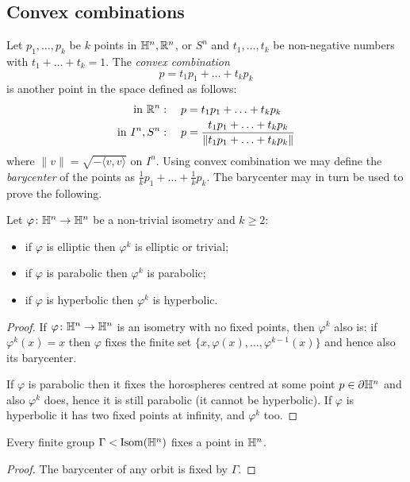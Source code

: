 \subsection{Convex combinations} \label{convex:subsection}
Let $p_1,\ldots, p_k$ be $k$ points in $\mathbb{H}^n, \mathbb{R}^n$, or $S^n$ and $t_1,\ldots, t_k$ be non-negative numbers with $t_1+\ldots + t_k=1$. The \emph{convex combination}   
$$p = t_1p_1+ \ldots + t_kp_k$$ 
is another point in the space defined as follows:
\begin{align*}
{\rm in\ } \mathbb{R}^n: \quad p & =  t_1p_1+ \ldots + t_kp_k \\
{\rm in\ } I^n,S^n: \quad p & = \frac{t_1p_1+ \ldots + t_kp_k}{\| t_1p_1+ \ldots + t_kp_k\|} 
\end{align*}
where $\|v\| = \sqrt{-\langle v, v \rangle}$ on $I^n$. Using convex combination we may define the \emph{barycenter} of the points as $\frac 1k p_1 + \ldots + \frac 1k p_k$. The barycenter may in turn be used to prove the following.

\begin{prop} \label{iterate:prop}
Let $\varphi\colon \mathbb{H}^n \to \mathbb{H}^n$ be a non-trivial isometry and $k\geqslant 2$:
\begin{itemize}
\item if $\varphi$ is elliptic then $\varphi^k$ is elliptic or trivial; 
\item if $\varphi$ is parabolic then $\varphi^k$ is parabolic;
\item if $\varphi$ is hyperbolic then $\varphi^k$ is hyperbolic.
\end{itemize}
\end{prop}
\begin{proof}
If $\varphi\colon \mathbb{H}^n \to\mathbb{H}^n$ is an isometry with no fixed points, then $\varphi^k$ also is: if $\varphi^k(x)=x$ then $\varphi$ fixes the finite set $\{x, \varphi(x), \ldots, \varphi^{k-1}(x)\}$ and hence also its barycenter.

If $\varphi$ is parabolic then it fixes the horospheres centred at some point $p\in\partial\mathbb{H}^n$ and also $\varphi^k$ does, hence it is still parabolic (it cannot be hyperbolic). If $\varphi$ is hyperbolic it has two fixed points at infinity, and $\varphi^k$ too.
\end{proof}

\begin{prop} \label{finite:fixed:prop}
Every finite group $\Gamma<{\rm Isom}(\mathbb{H}^n)$ fixes a point in $\mathbb{H}^n$.
\end{prop}
\begin{proof}
The barycenter of any orbit is fixed by $\Gamma$.
\end{proof}

